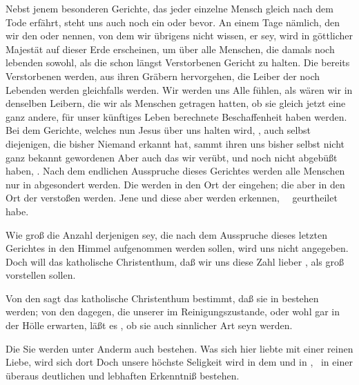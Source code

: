 \begin{aufza}
\item Nebst jenem besonderen Gerichte, das jeder einzelne Mensch gleich nach dem Tode erfährt, steht uns auch noch ein  oder  bevor. An einem Tage nämlich, den wir den  oder  nennen, von dem wir übrigens nicht wissen,  er sey, wird  in göttlicher Majestät auf dieser Erde erscheinen, um über alle Menschen, die damals noch lebenden sowohl, als die schon längst Verstorbenen Gericht zu halten. Die bereits Verstorbenen werden,  aus ihren Gräbern hervorgehen, die Leiber der noch Lebenden werden gleichfalls  werden. Wir werden uns Alle fühlen, als wären wir in denselben Leibern, die wir als Menschen getragen hatten, ob sie gleich jetzt eine ganz andere, für unser künftiges Leben berechnete Beschaffenheit haben werden. Bei dem Gerichte, welches nun Jesus über uns halten wird, , auch selbst diejenigen, die bisher Niemand erkannt hat, sammt ihren uns bisher selbst nicht ganz bekannt gewordenen  Aber auch  das wir verübt, und noch nicht abgebüßt haben, . Nach dem endlichen Ausspruche dieses Gerichtes werden alle Menschen nur in  abgesondert werden. Die  werden in den Ort der  eingehen; die  aber in den Ort der  verstoßen werden. Jene und diese aber werden erkennen,~\  geurtheilet habe.
\item Wie groß die Anzahl derjenigen sey, die nach dem Ausspruche dieses letzten Gerichtes in den Himmel aufgenommen werden sollen, wird uns nicht angegeben. Doch will das katholische Christenthum, daß wir uns diese Zahl lieber , als groß vorstellen sollen.
\item Von den  sagt das katholische Christenthum bestimmt, daß sie in  bestehen werden; von den  dagegen, die unserer im Reinigungszustande, oder wohl gar in der Hölle erwarten, läßt es , ob sie auch sinnlicher Art seyn werden.
\item Die  Sie werden unter Anderm auch  bestehen. Was sich hier liebte mit einer reinen Liebe, wird sich dort Doch unsere höchste Seligkeit wird in dem  und in , \dh\ in einer überaus deutlichen und lebhaften Erkenntniß  bestehen.

\end{aufza}
